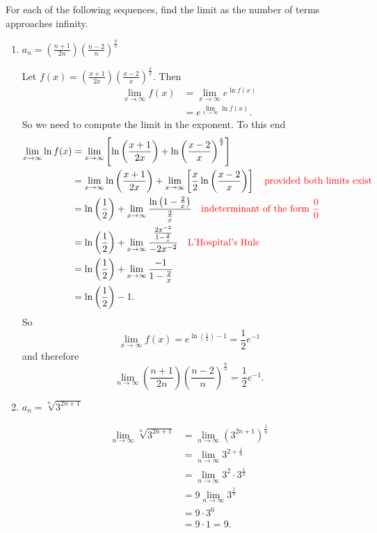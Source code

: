 \documentclass[]{ximera}
\begin{document}
\begin{problem}
For each of the following sequences, find the limit as the number of terms approaches infinity.
	\begin{enumerate}
	
	\item  $a_n = \left( \frac{n+1}{2n} \right) \left( \frac{n-2}{n} \right)^{\frac{n}{2}}$
	\begin{freeResponse}
	Let $f(x) =  \left( \frac{x+1}{2x} \right) \left( \frac{x-2}{x} \right)^{\frac{x}{2}}$.  
	Then
		\begin{align*}
		\lim_{x \to \infty} f(x) 
		&= \lim_{x \to \infty} e^{\ln f(x)}  \\
		&= e^{\lim_{x \to \infty} \ln f(x)}.
		\end{align*}
	So we need to compute the limit in the exponent.  To this end
		\begin{align*}
		\lim_{x \to \infty} \ln f(x) 
		&= \lim_{x \to \infty} \left[ \ln \left( \frac{x+1}{2x} \right) + \ln \left( \frac{x-2}{x} \right)^{\frac{x}{2}} \right]  \\
		&= \lim_{x \to \infty} \ln \left( \frac{x+1}{2x} \right) + \lim_{x \to \infty} \left[ \frac{x}{2} \ln \left( \frac{x-2}{x} \right) \right]  \quad {\color{red}\text{provided both limits exist}}  \\
		&= \ln \left( \frac{1}{2} \right) + \lim_{x \to \infty} \frac{\ln \left( 1 - \frac{2}{x} \right)}{\frac{2}{x}}  \quad {\color{red}\text{indeterminant of the form }\frac{0}{0}}\\
		&= \ln \left( \frac{1}{2} \right) + \lim_{x \to \infty} \frac{\frac{2x^{-2}}{1-\frac{2}{x}}}{-2x^{-2}}  \quad {\color{red}\text{L'Hospital's Rule}}  \\
		&= \ln \left( \frac{1}{2} \right) + \lim_{x \to \infty} \frac{-1}{1-\frac{2}{x}}  \\
		&= \ln \left( \frac{1}{2} \right) - 1.
		\end{align*}
	So 
		\[
		\lim_{x \to \infty} f(x) = e^{\ln \left( \frac{1}{2} \right) - 1} = \frac{1}{2} e^{-1}
		\]
	and therefore
		\[
		\lim_{n \to \infty} \left( \frac{n+1}{2n} \right) \left( \frac{n-2}{n} \right)^{\frac{n}{2}} = \frac{1}{2} e^{-1}.
		\]
	\end{freeResponse}
	
	
	
	\item  $a_n = \sqrt[n]{3^{2n+1}}$
	\begin{freeResponse}
		\begin{align*}
		\lim_{n \to \infty} \sqrt[n]{3^{2n+1}}
		&= \lim_{n \to \infty} \left( 3^{2n+1} \right)^{\frac{1}{n}}  \\
		&= \lim_{n \to \infty} 3^{2 + \frac{1}{n}}  \\
		&= \lim_{n \to \infty} 3^2 \cdot 3^{\frac{1}{n}}  \\
		&= 9 \lim_{n \to \infty} 3^{\frac{1}{n}}  \\
		&= 9 \cdot 3^0  \\
		&= 9 \cdot 1 = 9.
		\end{align*}
	\end{freeResponse}
	

\end{enumerate}
\end{problem}
\end{document}
